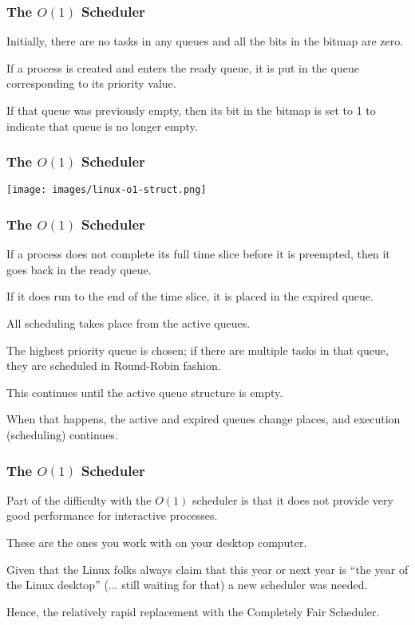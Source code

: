 \begin{frame}
\frametitle{The $O(1)$ Scheduler}

Initially, there are no tasks in any queues and all the bits in the bitmap are zero. 

If a process is created and enters the ready queue, it is put in the queue corresponding to its priority value. 

If that queue was previously empty, then its bit in the bitmap is set to 1 to indicate that queue is no longer empty.


\end{frame}

\begin{frame}
\frametitle{The $O(1)$ Scheduler}


\begin{center}
	\texttt{[image: images/linux-o1-struct.png]}
\end{center}

\end{frame}

\begin{frame}
\frametitle{The $O(1)$ Scheduler}

If a process does not complete its full time slice before it is preempted, then it goes back in the ready queue. 

If it does run to the end of the time slice, it is placed in the expired queue. 

All scheduling takes place from the active queues. 

The highest priority queue is chosen; if there are multiple tasks in that queue, they are scheduled in Round-Robin fashion. 

This continues until the active queue structure is empty. 

When that happens, the active and expired queues change places, and execution (scheduling) continues.


\end{frame}

\begin{frame}
\frametitle{The $O(1)$ Scheduler}

Part of the difficulty with the $O(1)$ scheduler is that it does not provide very good performance for interactive processes.

These are the ones you work with on your desktop computer. 

Given that the Linux folks always claim that this year or next year is ``the year of the Linux desktop'' (... still waiting for that) a new scheduler was needed. 

Hence, the relatively rapid replacement with the Completely Fair Scheduler.

\end{frame}

